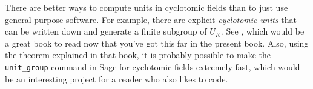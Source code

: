 There are better ways to compute units in cyclotomic fields than to
just use general purpose software. For example, there are explicit
{\em cyclotomic units} that can be written down and generate a finite
subgroup of $U_K$. See \cite[Ch.~8]{washington:cyclo}, which would be
a great book to read now that you've got this far in the present book.
Also, using the theorem explained in that book, it is probably
possible to make the \verb|unit_group| command in Sage for cyclotomic
fields extremely fast, which would be an interesting project for a
reader who also likes to code.


